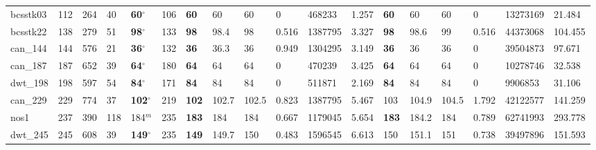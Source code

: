 \begin{table}[h!]
{\begin{tabular}{llllllllllllllllll}
            bcsstk03 & 112 & 264 & 40 & \textbf{60}$^{\circ}$ & 106 & \textbf{60} & 60 & 60 & 0 & 468233 & 1.257 & \textbf{60} & 60 & 60 & 0 & 13273169 & 21.484 \\
            bcsstk22 & 138 & 279 & 51 & \textbf{98}$^{\circ}$ & 133 & \textbf{98} & 98.4 & 98 & 0.516 & 1387795 & 3.327 & \textbf{98} & 98.6 & 99 & 0.516 & 44373068 & 104.455 \\
            can\_144 & 144 & 576 & 21 & \textbf{36}$^{\circ}$ & 132 & \textbf{36} & 36.3 & 36 & 0.949 & 1304295 & 3.149 & \textbf{36} & 36 & 36 & 0 & 39504873 & 97.671 \\
            can\_187 & 187 & 652 & 39 & \textbf{64}$^{\circ}$ & 180 & \textbf{64} & 64 & 64 & 0 & 470239 & 3.425 & \textbf{64} & 64 & 64 & 0 & 10278746 & 32.538 \\
            dwt\_198 & 198 & 597 & 54 & \textbf{84}$^{\circ}$ & 171 & \textbf{84} & 84 & 84 & 0 & 511871 & 2.169 & \textbf{84} & 84 & 84 & 0 & 9906853 & 31.106 \\
            can\_229 & 229 & 774 & 37 & \textbf{102}$^{\circ}$ & 219 & \textbf{102} & 102.7 & 102.5 & 0.823 & 1387795 & 5.467 & 103 & 104.9 & 104.5 & 1.792 & 42122577 & 141.259 \\
            nos1 & 237 & 390 & 118 & 184$^{m}$ & 235 & \textbf{183} & 184 & 184 & 0.667 & 1179045 & 5.654 & \textbf{183} & 184.2 & 184 & 0.789 & 62741993 & 293.778 \\
            dwt\_245 & 245 & 608 & 39 & \textbf{149}$^{\circ}$ & 235 & \textbf{149} & 149.7 & 150 & 0.483 & 1596545 & 6.613 & 150 & 151.1 & 151 & 0.738 & 39497896 & 151.593 \\
            \bottomrule
        \end{tabular}
    }{
}
\end{table}

